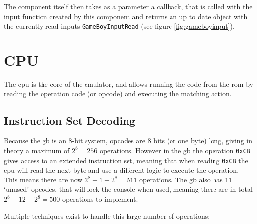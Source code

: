 \documentclass[11pt]{report}
\begin{document}
The component itself then takes as a parameter a callback, that is called with the input function created by this component and returns an up to date object with the currently read inputs \texttt{GameBoyInputRead} (see figure \ref{fig:gameboyinput}).

\section{CPU}

The \gls{cpu} is the core of the emulator, and allows running the code from the \gls{rom} by reading the operation code (or opcode) and executing the matching action.

\subsection{Instruction Set Decoding}

Because the \glsdesc{gb} is an 8-bit system, opcodes are 8 bits (or one byte) long, giving in theory a maximum of $2^8=256$ operations. However in the \gls{gb} the operation \texttt{0xCB} gives access to an extended instruction set, meaning that when reading \texttt{0xCB} the \gls{cpu} will read the next byte and use a different logic to execute the operation. This means there are now $2^8 - 1 + 2^8=511$ operations. The \gls{gb} also has 11 `unused' opcodes, that will lock the console when used\cite[CPU Comparison with Z80]{pandoc}, meaning there are in total $2^8 - 12 + 2^8 = 500$ operations to implement.

Multiple techniques exist to handle this large number of operations:
\end{document}
